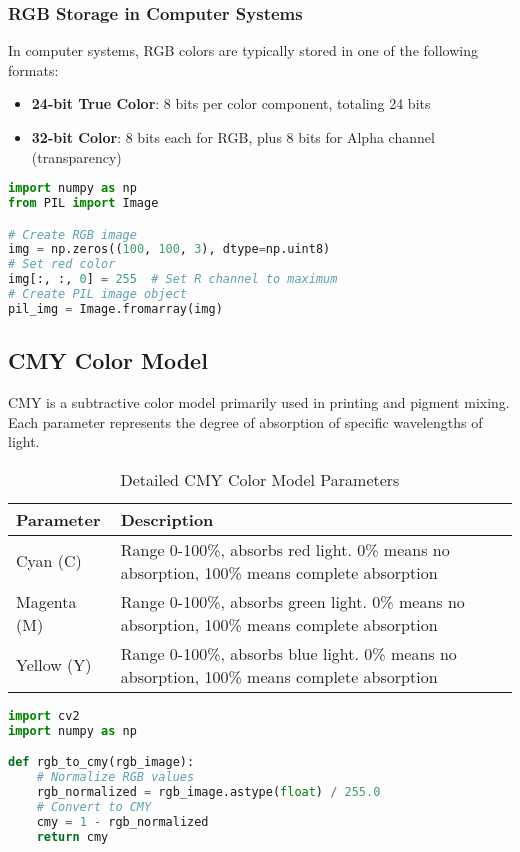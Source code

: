 \documentclass[12pt]{article}
\begin{document}
\subsubsection{RGB Storage in Computer Systems}
In computer systems, RGB colors are typically stored in one of the following formats:
\begin{itemize}
    \item \textbf{24-bit True Color}: 8 bits per color component, totaling 24 bits
    \item \textbf{32-bit Color}: 8 bits each for RGB, plus 8 bits for Alpha channel (transparency)
\end{itemize}

\begin{lstlisting}[language=python, caption=RGB Color Processing in Python]
import numpy as np
from PIL import Image

# Create RGB image
img = np.zeros((100, 100, 3), dtype=np.uint8)
# Set red color
img[:, :, 0] = 255  # Set R channel to maximum
# Create PIL image object
pil_img = Image.fromarray(img)
\end{lstlisting}

\subsection{CMY Color Model}
CMY is a subtractive color model primarily used in printing and pigment mixing. Each parameter represents the degree of absorption of specific wavelengths of light.

\begin{table}[H]
    \centering
    \begin{tabular}{lp{12cm}}
    \toprule
    \textbf{Parameter} & \textbf{Description} \\
    \midrule
    Cyan (C) & Range 0-100\%, absorbs red light. 0\% means no absorption, 100\% means complete absorption \\
    Magenta (M) & Range 0-100\%, absorbs green light. 0\% means no absorption, 100\% means complete absorption \\
    Yellow (Y) & Range 0-100\%, absorbs blue light. 0\% means no absorption, 100\% means complete absorption \\
    \bottomrule
    \end{tabular}
    \caption{Detailed CMY Color Model Parameters}
\end{table}

\begin{lstlisting}[language=python, caption=CMY Conversion Example in OpenCV]
import cv2
import numpy as np

def rgb_to_cmy(rgb_image):
    # Normalize RGB values
    rgb_normalized = rgb_image.astype(float) / 255.0
    # Convert to CMY
    cmy = 1 - rgb_normalized
    return cmy
\end{lstlisting}
\end{document}
